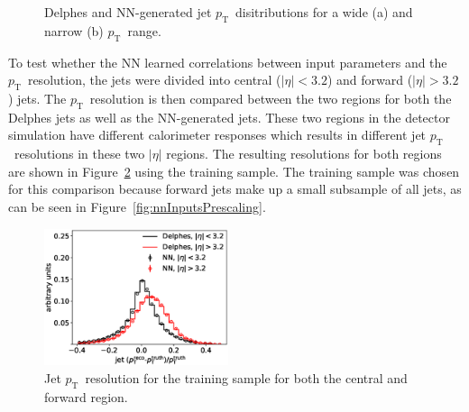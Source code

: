 \documentclass[showpacs,showkeys,preprint,prd,nofootinbib,linenumbers,12pt,superscriptaddress]{revtex4-1}
\def\pt{\ensuremath{p_{\mathrm{T}}}}
\begin{document}
\begin{figure}[htb]
  \caption{Delphes and NN-generated jet \pt\ disitributions for a wide (a) and narrow (b) \pt\ range.}
  \label{fig:pTNNVsDelphes}
\end{figure}

To test whether the NN learned correlations between input parameters and the \pt\ resolution, the jets were divided into central ($|\eta|<3.2$) and forward ($|\eta|>3.2$) jets. The \pt\ resolution is then compared between the two regions for both the Delphes jets as well as the NN-generated jets. These two regions in the detector simulation have different calorimeter responses which results in different jet \pt\ resolutions in these two $|\eta|$ regions. The resulting resolutions for both regions are shown in Figure~\ref{fig:nnRes} using the training sample. The training sample was chosen for this comparison because forward jets make up a small subsample of all jets, as can be seen in Figure~\ref{fig:nnInputsPrescaling}.

\begin{figure}[htb]
  \includegraphics[width=0.48\textwidth]{figures/nn/jet_pTResEta_batchSize1000_epochs1000_nCats400.eps}
  \caption{Jet \pt\ resolution for the training sample for both the central and forward region. }
  \label{fig:nnRes}
\end{figure}
\end{document}

